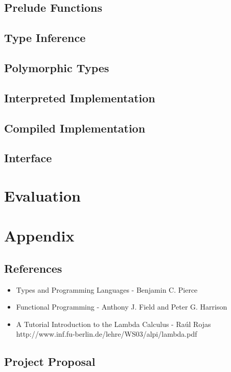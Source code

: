\documentclass{article}
\begin{document}
\subsection{Prelude Functions}
\subsection{Type Inference}
\subsection{Polymorphic Types}
\subsection{Interpreted Implementation}
\subsection{Compiled Implementation}
\subsection{Interface}

\pagebreak
\section{Evaluation}

\pagebreak
\section{Appendix}
\subsection{References}
\begin{itemize}
    \item Types and Programming Languages - Benjamin C. Pierce
    \item Functional Programming - Anthony J. Field and Peter G. Harrison
    \item A Tutorial Introduction to the Lambda Calculus - Ra\'{u}l Rojas \\
        http://www.inf.fu-berlin.de/lehre/WS03/alpi/lambda.pdf
\end{itemize}

\subsection{Project Proposal}
\end{document}
